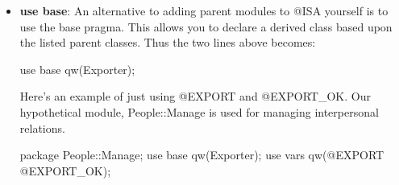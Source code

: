 \documentclass{report}
\begin{document}
\begin{itemize}
            Now when Perl goes looking for the import function it will first look in our package. If it can’t be found there, Perl will look for a special array called @ISA. The contents of the @ISA array is interpreted as a list of parent classes, and each of these will be searched for the missing method.
            \bigbreak \noindent 
            To specify that this package is a sub-class of the Exporter module we include the following lines:
            \bigbreak \noindent 
            \begin{perlcode}
            use Exporter;
            our @ISA = qw(Exporter);
            \end{perlcode}
            \bigbreak \noindent 
            \textbf{Note:} ISA means is-a.
        \item \textbf{use base}: An alternative to adding parent modules to @ISA yourself is to use the base pragma. This allows you to declare a derived class based upon the listed parent classes. Thus the two lines above becomes:
            \bigbreak \noindent 
            \begin{perlcode}
            use base qw(Exporter);
            \end{perlcode}
            \bigbreak \noindent 
            Here’s an example of just using @EXPORT and @EXPORT\_OK. Our hypothetical module, People::Manage is used for managing interpersonal relations.
            \bigbreak \noindent 
            \begin{perlcode}
                package People::Manage;
                use base qw(Exporter);
                use vars qw(@EXPORT @EXPORT_OK);


\end{perlcode}
\end{itemize}
\end{document}
